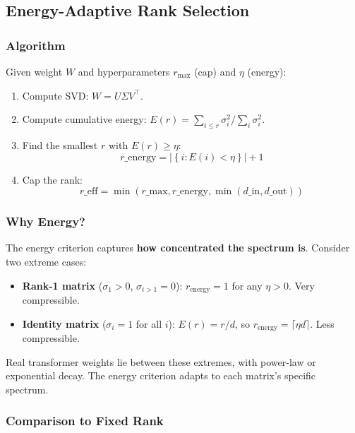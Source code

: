 \subsection{Energy-Adaptive Rank Selection}

\subsubsection{Algorithm}

Given weight $W$ and hyperparameters $r_\text{max}$ (cap) and $\eta$ (energy):

\begin{enumerate}
\item Compute SVD: $W = U \Sigma V^\top$.
\item Compute cumulative energy: $E(r) = \sum_{i \leq r} \sigma_i^2 / \sum_i \sigma_i^2$.
\item Find the smallest $r$ with $E(r) \geq \eta$:
  $$
  r\_\text{energy} = \left|\left\{i : E(i) < \eta\right\}\right| + 1
  \tag{4.3}
  $$
\item Cap the rank:
  $$
  r\_\text{eff} = \min(r\_\text{max}, r\_\text{energy}, \min(d\_\text{in}, d\_\text{out}))
  \tag{4.4}
  $$

\end{enumerate}
\subsubsection{Why Energy?}

The energy criterion captures \textbf{how concentrated the spectrum is}. 
Consider two extreme cases:

\begin{itemize}
\item \textbf{Rank-1 matrix} ($\sigma_1 > 0$, $\sigma_{i>1} = 0$): $r_\text{energy} = 1$
  for any $\eta > 0$. Very compressible.
\item \textbf{Identity matrix} ($\sigma_i = 1$ for all $i$): $E(r) = r/d$, so
  $r_\text{energy} = \lceil \eta d \rceil$. Less compressible.

\end{itemize}
Real transformer weights lie between these extremes, with power-law or 
exponential decay. The energy criterion adapts to each matrix's specific 
spectrum.

\subsubsection{Comparison to Fixed Rank}

